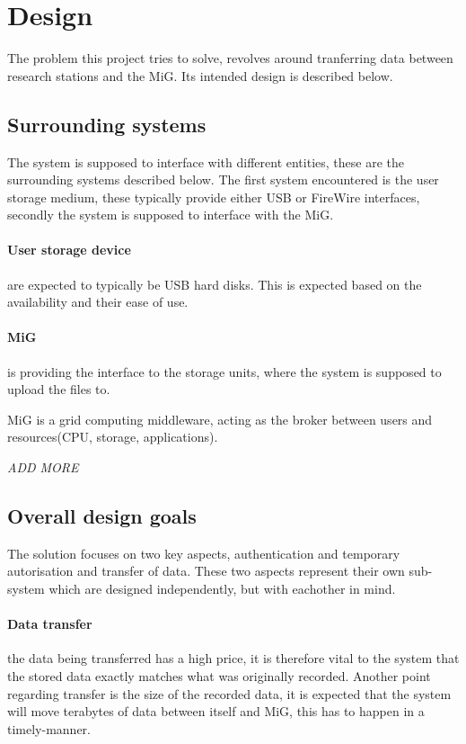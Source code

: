 \section{Design}
The problem this project tries to solve, revolves around tranferring data 
between research stations and the MiG. Its intended design is described below.

\subsection{Surrounding systems}

The system is supposed to interface with different entities, these are the
surrounding systems described below. The first system encountered is the user
storage medium, these typically provide either USB or FireWire interfaces,
secondly the system is supposed to interface with the MiG.

\paragraph{User storage device} are expected to typically be USB hard disks. 
This is expected based on the availability and their ease of use.

\paragraph{MiG} is providing the interface to the storage units, where the
system is supposed to upload the files to. 

MiG is a grid computing middleware, acting as the broker between users and
resources(CPU, storage, applications).

\textit{ ADD MORE }

\subsection{Overall design goals}

The solution focuses on two key aspects, authentication and temporary
autorisation and transfer of data. These two aspects represent their own 
sub-system which are designed independently, but with eachother in mind.

\paragraph{Data transfer} the data being transferred has a high price, it is
therefore vital to the system that the stored data exactly matches what was
originally recorded. Another point regarding transfer is the size of the
recorded data, it is expected that the system will move terabytes of data
between itself and MiG, this has to happen in a timely-manner.

